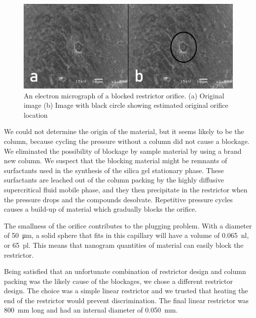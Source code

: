 \begin{figure}
\centering
\includegraphics[width=\textwidth]{Figures/Blockage_1920.png}
\decoRule

\caption[A electron microscope photo of a blocked restrictor orifice]{An
electron micrograph of a blocked restrictor orifice. (a) Original
image (b) Image with black circle showing estimated original orifice location}

\label{fig:restrictorblockage}
\end{figure}

We could not determine the origin of the material, but it seems likely to be the
column, because cycling the pressure without a column did not cause a blockage.
We eliminated the possibility of blockage by sample material by using a brand
new column. We suspect that the blocking material might be remnants of
surfactants used in the synthesis of the silica gel stationary phase. These
surfactants are leached out of the column packing by the highly diffusive
supercritical fluid mobile phase, and they then precipitate in the restrictor
when the pressure drops and the compounds desolvate. Repetitive pressure cycles
causes a build-up of material which gradually blocks the orifice.

The smallness of the orifice contributes to the plugging problem. With a
diameter of \SI{50}{\micro\metre}, a solid sphere that fits in this capillary
will have a volume of \SI{0.065}{\nano\litre}, or \SI{65}{\pico\litre}. This
means that nanogram quantities of material can easily block the restrictor.

Being satisfied that an unfortunate combination of restrictor design and column
packing was the likely cause of the blockages, we chose a different restrictor
design. The choice was a simple linear restrictor and we trusted that heating
the end of the restrictor would prevent discrimination. The final linear
restrictor was \SI{800}{\milli\metre} long and had an internal diameter of
\SI{0.050}{\milli\metre}.

